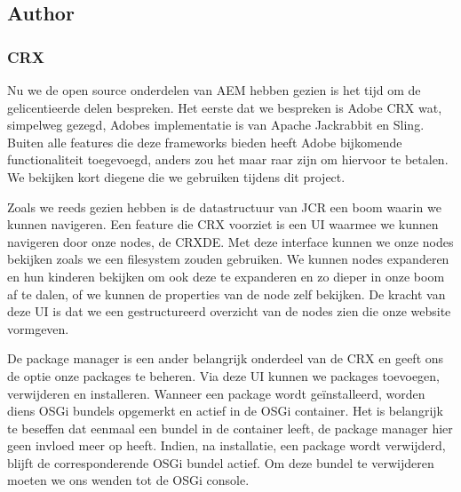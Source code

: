 \documentclass{article}
\begin{document}
	\subsection{Author}
	\subsubsection{CRX}
	Nu we de open source onderdelen van AEM hebben gezien is het tijd om de gelicentieerde delen bespreken. Het eerste dat we bespreken is Adobe CRX wat, simpelweg gezegd, Adobes implementatie is van Apache Jackrabbit en Sling. Buiten alle features die deze frameworks bieden heeft Adobe bijkomende functionaliteit toegevoegd, anders zou het maar raar zijn om hiervoor te betalen. We bekijken kort diegene die we gebruiken tijdens dit project.
	\par
	Zoals we reeds gezien hebben is de datastructuur van JCR een boom waarin we kunnen navigeren. Een feature die CRX voorziet is een UI waarmee we kunnen navigeren door onze nodes, de CRXDE. Met deze interface kunnen we onze nodes bekijken zoals we een filesystem zouden gebruiken. We kunnen nodes expanderen en hun kinderen bekijken om ook deze te expanderen en zo dieper in onze boom af te dalen, of we kunnen de properties van de node zelf bekijken. De kracht van deze UI is dat we een gestructureerd overzicht van de nodes zien die onze website vormgeven.
	\par
	De package manager is een ander belangrijk onderdeel van de CRX en geeft ons de optie onze packages te beheren. Via deze UI kunnen we packages toevoegen, verwijderen en installeren. Wanneer een package wordt ge\"installeerd, worden diens OSGi bundels opgemerkt en actief in de OSGi container. Het is belangrijk te beseffen dat eenmaal een bundel in de container leeft, de package manager hier geen invloed meer op heeft. Indien, na installatie, een package wordt verwijderd, blijft de corresponderende OSGi bundel actief. Om deze bundel te verwijderen moeten we ons wenden tot de OSGi console.
\end{document}

